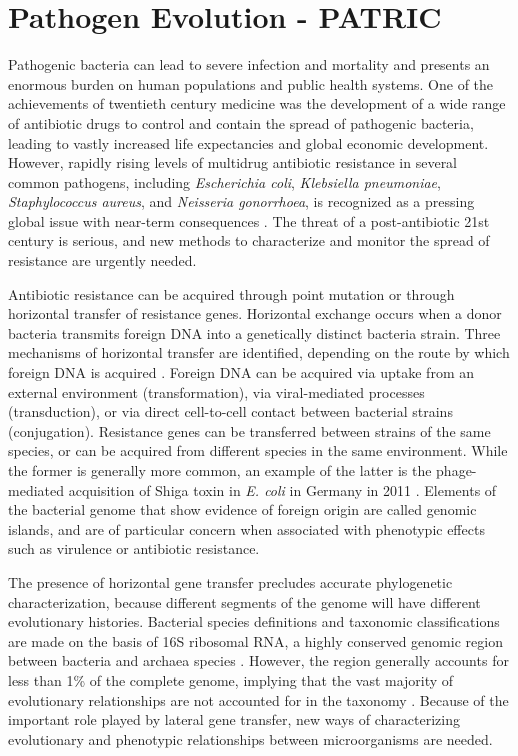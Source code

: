 \chapter{Pathogen Evolution - PATRIC}
\label{ch:pathogens}

Pathogenic bacteria can lead to severe infection and mortality and presents an enormous burden on human populations and public health systems.
One of the achievements of twentieth century medicine was the development of a wide range of antibiotic drugs to control and contain the spread of pathogenic bacteria, leading to vastly increased life expectancies and global economic development.
However, rapidly rising levels of multidrug antibiotic resistance in several common pathogens, including \emph{Escherichia coli}, \emph{Klebsiella pneumoniae}, \emph{Staphylococcus aureus}, and \emph{Neisseria gonorrhoea}, is recognized as a pressing global issue with near-term consequences \cite{Neu:1992,Thomas:2005,WHO:2014}.
The threat of a post-antibiotic 21st century is serious, and new methods to characterize and monitor the spread of resistance are urgently needed.

Antibiotic resistance can be acquired through point mutation or through horizontal transfer of resistance genes.
Horizontal exchange occurs when a donor bacteria transmits foreign DNA into a genetically distinct bacteria strain.
Three mechanisms of horizontal transfer are identified, depending on the route by which foreign DNA is acquired \cite{Ochman:2000}.
Foreign DNA can be acquired via uptake from an external environment (transformation), via viral-mediated processes (transduction), or via direct cell-to-cell contact between bacterial strains (conjugation).
Resistance genes can be transferred between strains of the same species, or can be acquired from different species in the same environment.
While the former is generally more common, an example of the latter is the phage-mediated acquisition of Shiga toxin in \emph{E. coli} in Germany in 2011 \cite{Rohde:2011}.
Elements of the bacterial genome that show evidence of foreign origin are called genomic islands, and are of particular concern when associated with phenotypic effects such as virulence or antibiotic resistance.

The presence of horizontal gene transfer precludes accurate phylogenetic characterization, because different segments of the genome will have different evolutionary histories.
Bacterial species definitions and taxonomic classifications are made on the basis of 16S ribosomal RNA, a highly conserved genomic region between bacteria and archaea species \cite{Woese:1977vd}.
However, the region generally accounts for less than 1\% of the complete genome, implying that the vast majority of evolutionary relationships are not accounted for in the taxonomy \cite{Dagan:2006}.
Because of the important role played by lateral gene transfer, new ways of characterizing evolutionary and phenotypic relationships between microorganisms are needed.